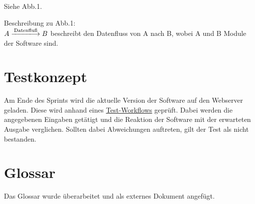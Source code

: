 \documentclass[11pt,a4paper]{article}
\begin{document}
Siehe Abb.1.\bigskip

Beschreibung zu Abb.1: \\
$A \xlongrightarrow{\text{Datenfluß}} B $ beschreibt den Datenfluss von A nach B, wobei A und B Module der Software sind.


\section{Testkonzept}
Am Ende des Sprints wird die aktuelle Version der Software auf den Webserver geladen. Diese wird anhand eines \href{https://github.com/GKP15/pucman/wiki/Test-workflow}{Test-Workflows} geprüft. Dabei werden die angegebenen Eingaben getätigt und die Reaktion der Software mit der erwarteten Ausgabe verglichen. Sollten dabei Abweichungen auftreten, gilt der Test als nicht bestanden.

\section{Glossar}
Das Glossar wurde überarbeitet und als externes Dokument angefügt.
\end{document}
